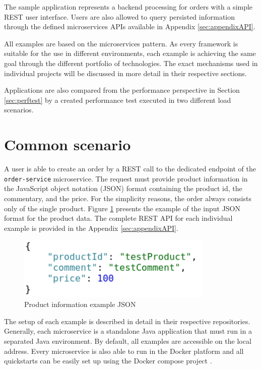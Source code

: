 \documentclass[oneside,
  digital, %
  table,   %
  lof,     %
  lot,     %
]{fithesis3}
\begin{document}
The sample application represents a backend processing for orders with a simple REST user interface. Users are also allowed to query persisted information through the defined microservices APIs available in Appendix \ref{sec:appendixAPI}.

All examples are based on the microservices pattern. As every framework is suitable for the use in different environments, each example is achieving the same goal through the different portfolio of technologies. The exact mechanisms used in individual projects will be discussed in more detail in their respective sections.

Applications are also compared from the performance perspective in Section \ref{sec:perftest} by a created performance test executed in two different load scenarios.

\section{Common scenario}

A user is able to create an order by a REST call to the dedicated endpoint of the \texttt{order-service} microservice. The request must provide product information in the JavaScript object notation (JSON) format containing the product id, the commentary, and the price. For the simplicity reasons, the order always consists only of the single product. Figure \ref{fig:inputJson} presents the example of the input JSON format for the product data. The complete REST API for each individual example is provided in the Appendix \ref{sec:appendixAPI}.

\begin{figure}
    \begin{center}
        \includegraphics[height=30mm]{images/productInfoJSON.png}
    \end{center}
    \caption{Product information example JSON}
    \label{fig:inputJson}
\end{figure}

The setup of each example is described in detail in their respective repositories. Generally, each microservice is a standalone Java application that must run in a separated Java environment. By default, all examples are accessible on the local address. Every microservice is also able to run in the Docker \cite{docker} platform and all quickstarts can be easily set up using the Docker compose project \cite{docker_compose}.
\end{document}
